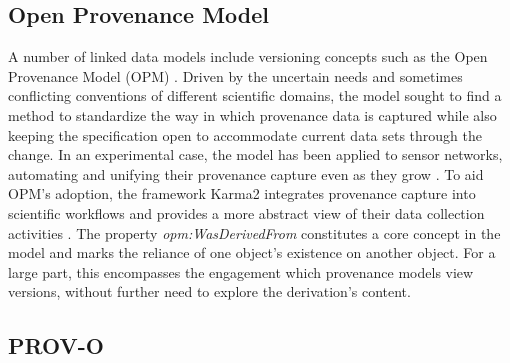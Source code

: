 \subsection{Open Provenance Model}

A number of linked data models include versioning concepts such as the Open Provenance Model (OPM) \cite{moreau2008open}.
Driven by the uncertain needs and sometimes conflicting conventions of different scientific domains, the model sought to find a method to standardize the way in which provenance data is captured while also keeping the specification open to accommodate current data sets through the change.
In an experimental case, the model has been applied to sensor networks, automating and unifying their provenance capture even as they grow \cite{5478496}.
To aid OPM's adoption, the framework Karma2 integrates provenance capture into scientific workflows and provides a more abstract view of their data collection activities \cite{simmhan2010karma2}.
The property \textit{opm:WasDerivedFrom} constitutes a core concept in the model and marks the reliance of one object's existence on another object.
For a large part, this encompasses the engagement which provenance models view versions, without further need to explore the derivation's content.

\subsection{PROV-O}\label{sec:prov}

